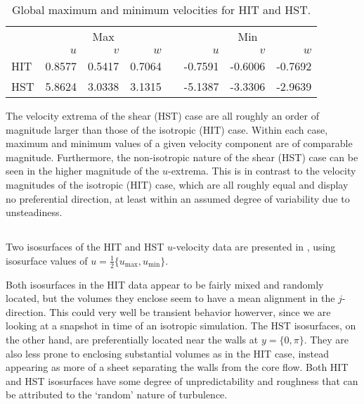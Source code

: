 \documentclass[11pt]{article}
\begin{document}
\begin{table}[h]
\centering
\begin{tabular}{@{}lrrrcrrr@{}}
\toprule
& \multicolumn{3}{c}{Max} && \multicolumn{3}{c}{Min} \\
\cmidrule{2-4} \cmidrule{6-8}
& $u$ & $v$ & $w$ && $u$ & $v$ & $w$ \\
\midrule
HIT & 0.8577 & 0.5417 & 0.7064 && -0.7591 & -0.6006 & -0.7692 \\
HST & 5.8624 & 3.0338 & 3.1315 && -5.1387 & -3.3306 & -2.9639 \\
\bottomrule
\end{tabular}
\vspace{6pt}
\caption{Global maximum and minimum velocities for HIT and HST.}
\label{tab:prob_1_1_max_min_velocities}
\end{table}

The velocity extrema of the shear (HST) case are all roughly an order of magnitude larger than those of the isotropic (HIT) case. Within each case, maximum and minimum values of a given velocity component are of comparable magnitude. Furthermore, the non-isotropic nature of the shear (HST) case can be seen in the higher magnitude of the $u$-extrema. This is in contrast to the velocity magnitudes of the isotropic (HIT) case, which are all roughly equal and display no preferential direction, at least within an assumed degree of variability due to unsteadiness.

\subsection{}

Two isosurfaces of the HIT and HST $u$-velocity data are presented in , using isosurface values of $u=\tfrac{1}{2} \{u_\text{max}, u_\text{min}\}$.

Both isosurfaces in the HIT data appear to be fairly mixed and randomly located, but the volumes they enclose seem to have a mean alignment in the $j$-direction. This could very well be transient behavior howerver, since we are looking at a snapshot in time of an isotropic simulation. The HST isosurfaces, on the other hand, are preferentially located near the walls at $y = \{0, \pi\}$. They are also less prone to enclosing substantial volumes as in the HIT case, instead appearing as more of a sheet separating the walls from the core flow. Both HIT and HST isosurfaces have some degree of unpredictability and roughness that can be attributed to the `random' nature of turbulence.
\end{document}
